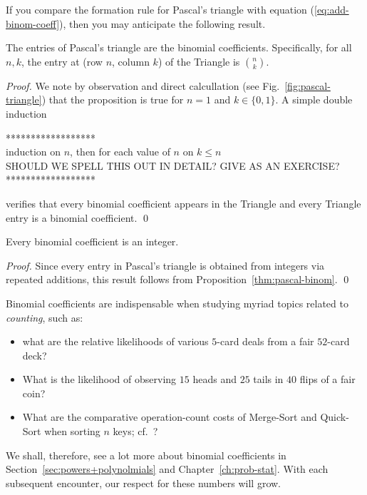 If you compare the formation rule for Pascal's triangle with equation
(\ref{eq:add-binom-coeff}), then you may anticipate the following
result.


\begin{prop}
\label{thm:pascal-binom}
The entries of Pascal's triangle are the binomial coefficients.
Specifically, for all $n,k$, the entry at (row $n$, column $k$) of the
Triangle is $\displaystyle {n \choose k}$.
\end{prop}

\begin{proof}
We note by observation and direct calcullation (see
Fig.~\ref{fig:pascal-triangle}) that the proposition is true for $n =
1$ and $k \in \{0, 1\}$.  A simple double induction

\noindent
****************** \\
induction on $n$, then for each value of $n$ on $k \leq n$ \\
{\Arny SHOULD WE SPELL THIS OUT IN DETAIL?  GIVE AS AN EXERCISE?} \\
******************

\noindent
verifies that every binomial coefficient appears in the Triangle and
every Triangle entry is a binomial coefficient.  \qed
\end{proof}

\medskip


\begin{prop}
\label{thm:binomcoeff-integer}
Every binomial coefficient is an integer.
\end{prop}

\begin{proof}
Since every entry in Pascal's triangle is obtained from integers via
repeated additions, this result follows from
Proposition~\ref{thm:pascal-binom}.  \qed
\end{proof}

\bigskip

Binomial coefficients are indispensable when studying myriad topics
related to {\em counting}, such as:
\begin{itemize}
\item
what are the relative likelihoods of various $5$-card deals from a
fair $52$-card deck?
\item
What is the likelihood of observing $15$ {\sc head}s and $25$ {\sc
  tail}s in $40$ flips of a fair coin?
\item
What are the comparative operation-count costs of Merge-Sort and
Quick-Sort when sorting $n$ keys; cf.~\cite{CLRS}?

\end{itemize}
We shall, therefore, see a lot more about binomial coefficients in
Section~\ref{sec:powers+polynolmials} and Chapter~\ref{ch:prob-stat}.
With each subsequent encounter, our respect for these numbers will
grow.


